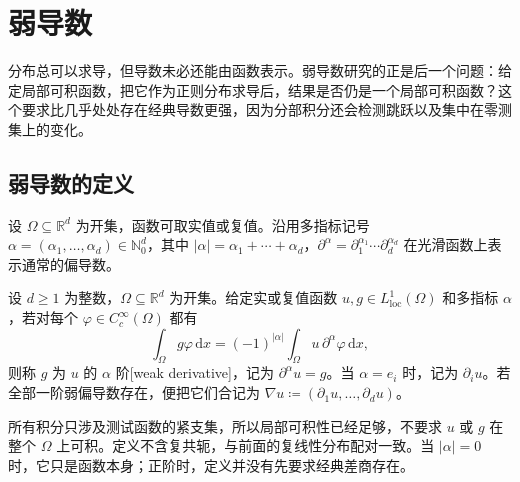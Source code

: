 \section{弱导数}
\label{b1:sec:2004}

分布总可以求导，但导数未必还能由函数表示。弱导数研究的正是后一个问题：给定局部可积函数，把它作为正则分布求导后，结果是否仍是一个局部可积函数？这个要求比几乎处处存在经典导数更强，因为分部积分还会检测跳跃以及集中在零测集上的变化。


\subsection{弱导数的定义}
\label{b1:subsec:200401}

设 \(\Omega\subseteq\mathbb R^d\) 为开集，函数可取实值或复值。沿用多指标记号 \(\alpha=(\alpha_1,\ldots,\alpha_d)\in\mathbb N_0^d\)，其中 \(|\alpha|=\alpha_1+\cdots+\alpha_d\)，\(\partial^\alpha=\partial_1^{\alpha_1}\cdots\partial_d^{\alpha_d}\) 在光滑函数上表示通常的偏导数。

\begin{definition}
\label{b1:def:weak-derivative}
设 \(d\geq1\) 为整数，\(\Omega\subseteq\mathbb R^d\) 为开集。给定实或复值函数 \(u,g\in L^1_{\mathrm{loc}}(\Omega)\) 和多指标 \(\alpha\)，若对每个 \(\varphi\in C_c^\infty(\Omega)\) 都有
\begin{equation}
\label{b1:eq:weak-derivative-test}
 \int_\Omega g\varphi\,\mathrm dx
 =(-1)^{|\alpha|}\int_\Omega u\,\partial^\alpha\varphi\,\mathrm dx,
\end{equation}
则称 \(g\) 为 \(u\) 的 \(\alpha\) 阶[weak derivative]，记为 \(\partial^\alpha u=g\)。当 \(\alpha=e_i\) 时，记为 \(\partial_i u\)。若全部一阶弱偏导数存在，便把它们合记为 \(\nabla u\coloneqq(\partial_1u,\ldots,\partial_du)\)。
\end{definition}

所有积分只涉及测试函数的紧支集，所以局部可积性已经足够，不要求 \(u\) 或 \(g\) 在整个 \(\Omega\) 上可积。定义不含复共轭，与前面的复线性分布配对一致。当 \(|\alpha|=0\) 时，它只是函数本身；正阶时，定义并没有先要求经典差商存在。

